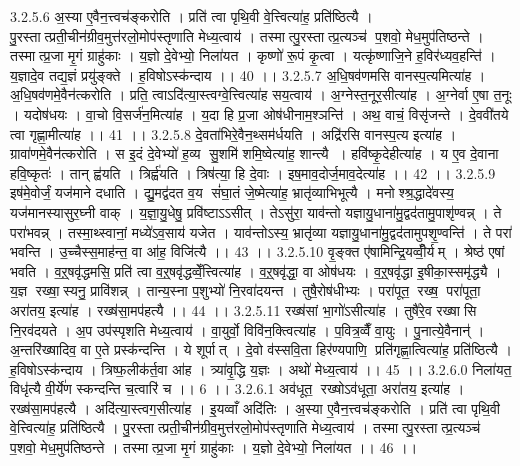 3.2.5.6
अ॒स्या ए॒वैन॒त्त्वच॑ङ्करोति । प्रति॑ त्वा पृथि॒वी वे॒त्त्वित्या॑ह॒ प्रति॑ष्ठित्यै । पु॒रस्तात्प्रती॒चीन॑ग्रीव॒मुत्त॑रलो॒मोप॑स्तृणाति मेध्य॒त्वाय॑ । तस्मात्पु॒रस्तात्प्र॒त्यञ्च॑ प॒शवो॒ मेध॒मुप॑तिष्ठन्ते । तस्मात्प्र॒जा मृ॒गं ग्राहु॑काः । य॒ज्ञो दे॒वेभ्यो॒ निला॑यत । कृष्णो॑ रू॒पं कृ॒त्वा । यत्कृ॑ष्णाजि॒ने ह॒विर॑ध्यव॒हन्ति॑ । य॒ज्ञादे॒व तद्य॒ज्ञं प्रयु॑ङ्क्ते । ह॒विषोऽस्क॑न्दाय ।। 40 ।।
3.2.5.7
अ॒धि॒षव॑णमसि वानस्प॒त्यमित्या॑ह । अ॒धि॒षव॑णमे॒वैन॑त्करोति । प्रति॒ त्वाऽदि॑त्या॒स्त्वग्वे॒त्त्वित्या॑ह सय॒त्वाय॑ । अ॒ग्नेस्त॒नूर॒सीत्या॑ह । अ॒ग्नेर्वा ए॒षा त॒नूः । यदोष॑धयः । वा॒चो वि॒सर्ज॑न॒मित्या॑ह । य॒दा हि प्र॒जा ओष॑धीनाम॒श्ञन्ति॑ । अथ॒ वाचं॒ विसृ॑जन्ते । दे॒ववी॑तये त्वा गृह्णा॒मीत्या॑ह ।। 41 ।।
3.2.5.8
दे॒वता॑भिरे॒वैन॒थ्सम॑र्धयति । अद्रि॑रसि वानस्प॒त्य इत्या॑ह । ग्रावा॑णमे॒वैन॑त्करोति । स इ॒दं दे॒वेभ्यो॑ ह॒व्य सु॒शमि॑ शमि॒ष्वेत्या॑ह॒ शान्त्यै । हवि॑ष्कृ॒देहीत्या॑ह । य ए॒व दे॒वाना॑ हवि॒ष्कृतः॑ । तान्‌ ह्व॑यति । त्रिर्ह्व॑यति । त्रिष॑त्या॒ हि दे॒वाः । इष॒माव॒दोर्ज॒माव॒देत्या॑ह ।। 42 ।।
3.2.5.9
इष॑मे॒वोर्जं॒ यज॑माने दधाति । द्यु॒मद्व॑दत व॒य सं॑घा॒तं जे॒ष्मेत्या॑ह॒ भ्रातृ॑व्याभिभूत्यै । मनोश्श्र॒द्धादे॑वस्य॒ यज॑मानस्यासुर॒घ्नी वाक् । य॒ज्ञा॒यु॒धेषु॒ प्रवि॑ष्टाऽऽसीत् । तेऽसु॑रा॒ याव॑न्तो यज्ञायु॒धाना॑मु॒द्वद॑तामु॒पाशृ॑ण्वन्न् । ते परा॑भवन्न् । तस्मा॒थ्स्वानां॒ मध्ये॑ऽव॒साय॑ यजेत । याव॑न्तोऽस्य॒ भ्रातृ॑व्या यज्ञायु॒धाना॑मु॒द्वद॑तामुपशृ॒ण्वन्ति॑ । ते परा॑ भवन्ति । उ॒च्चैस्स॒माह॑न्त॒ वा आ॑ह॒ विजि॑त्यै ।। 43 ।।
3.2.5.10
वृ॒ङ्क्त ए॑षामिन्द्रि॒यव्वीँ॒र्यम् । श्रेष्ठ॑ एषां भवति । व॒ऱ्॒षवृ॑द्धमसि॒ प्रति॑ त्वा व॒ऱ्॒षवृ॑द्धव्वेँ॒त्त्वित्या॑ह । व॒ऱ्॒षवृ॑द्धा॒ वा ओष॑धयः । व॒ऱ्॒षवृ॑द्धा इ॒षीका॒स्समृ॑द्ध्यै । य॒ज्ञ रख्षा॒॒स्यनु॒ प्रावि॑शन्न् । तान्य॒स्ना प॒शुभ्यो॑ नि॒रवा॑दयन्त । तुषै॒रोष॑धीभ्यः । परा॑पूत॒॒ रख्ष॒ परा॑पूता॒ अरा॑तय॒ इत्या॑ह । रख्ष॑सा॒मप॑हत्यै ।। 44 ।।
3.2.5.11
रख्ष॑सां भा॒गो॑ऽसीत्या॑ह । तुषै॑रे॒व रख्षा॑सि नि॒रव॑दयते । अ॒प उप॑स्पृशति मेध्य॒त्वाय॑ । वा॒युर्वो॒ विवि॑न॒क्त्वित्या॑ह । प॒वित्र॒व्वैँ वा॒युः । पु॒नात्ये॒वैनान्॑ । अ॒न्तरि॑ख्षादिव॒ वा ए॒ते प्रस्क॑न्दन्ति । ये शूर्पात् । दे॒वो व॑स्सवि॒ता हिर॑ण्यपाणि॒ प्रति॑गृह्णा॒त्वित्या॑ह॒ प्रति॑ष्ठित्यै । ह॒विषोऽस्क॑न्दाय । त्रिष्फ॒लीक॑र्त॒वा आ॑ह । त्र्या॑वृ॒द्धि य॒ज्ञः । अथो॑ मेध्य॒त्वाय॑ ।। 45 ।।
3.2.6.0
निला॑यत॒ विधृ॑त्यै वी॒र्ये॑ण स्कन्दन्ति च॒त्वारि॑ च ।। 6 ।।
3.2.6.1
अव॑धूत॒॒ रख्षोऽव॑धूता॒ अरा॑तय॒ इत्या॑ह । रख्ष॑सा॒मप॑हत्यै । अदि॑त्या॒स्त्वग॒सीत्या॑ह । इ॒यव्वाँ अदि॑तिः । अ॒स्या ए॒वैन॒त्त्वच॑ङ्करोति । प्रति॑ त्वा पृथि॒वी वे॒त्त्वित्या॑ह॒ प्रति॑ष्ठित्यै । पु॒रस्तात्प्रती॒चीन॑ग्रीव॒मुत्त॑रलो॒मोप॑स्तृणाति मेध्य॒त्वाय॑ । तस्मात्पु॒रस्तात्प्र॒त्यञ्च॑ प॒शवो॒ मेध॒मुप॑तिष्ठन्ते । तस्मात्प्र॒जा मृ॒गं ग्राहु॑काः । य॒ज्ञो दे॒वेभ्यो॒ निला॑यत ।। 46 ।।
